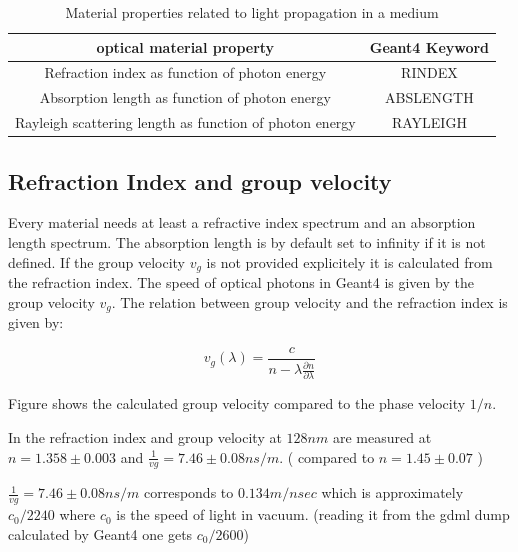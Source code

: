 \documentclass{article}
\begin{document}
\begin{table}[h!]
  \begin{center}
    \label{tab:table2}
    \begin{tabular}{|c|c|} 
      \hline
      \textbf{optical material property} & \textbf{Geant4 Keyword}\\
      \hline
      Refraction index as function of photon energy &RINDEX      \\
      Absorption length as function of photon energy& ABSLENGTH   \\
      Rayleigh scattering length as function of photon energy & RAYLEIGH    \\
      \hline
    \end{tabular}
  \end{center}
  \caption{Material properties related to light propagation in a medium}
 \end{table}

\subsection{Refraction Index and group velocity}
 Every material needs at least
a refractive index spectrum  and an absorption 
length spectrum.  The absorption length is by default set to infinity if it is not defined. If the group velocity $v_g$ is not provided explicitely it is calculated from the refraction index.
The speed of optical photons in Geant4 is given by the group velocity $v_g$. The relation between group velocity and the refraction index is given by:

\begin{equation}
  v_g (\lambda)= \frac{c}{n-\lambda \frac{\partial{n}}{\partial{\lambda}}}
      \label{equ:vgroup}
\end{equation}

Figure \label{fig:vg} shows the calculated group velocity compared to the phase velocity $1/n$.

In \cite{ref:vg} the refraction index and group velocity  at $128 nm$ are measured at $n = 1.358 \pm 0.003$ and $\frac{1}{vg} = 7.46 \pm 0.08 ns/m$.
( compared to $n= 1.45 \pm 0.07$ \cite{ref:grace})

$\frac{1}{vg} = 7.46 \pm 0.08 ns/m$ corresponds to $0.134 m/nsec$ which is approximately $c_0/2240$ where $c_0$ is the speed of light in vacuum.
(reading it from the gdml dump calculated by Geant4 one gets $c_0/2600$)
\end{document}
